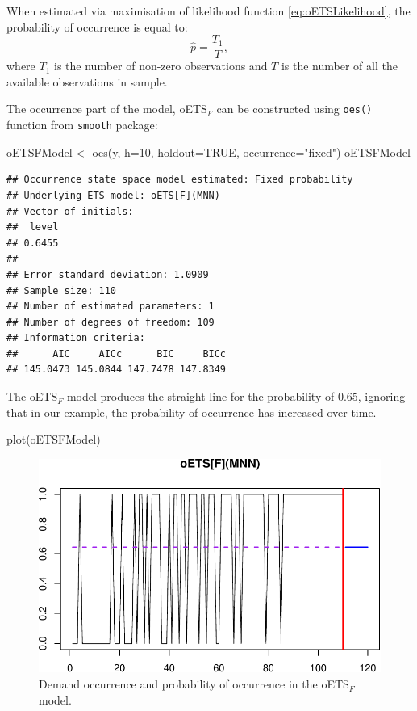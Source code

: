 \documentclass[
]{book}
\newenvironment{Shaded}{\begin{snugshade}}{\end{snugshade}}
\newcommand{\AttributeTok}[1]{\textcolor[rgb]{0.77,0.63,0.00}{#1}}
\newcommand{\ConstantTok}[1]{\textcolor[rgb]{0.00,0.00,0.00}{#1}}
\newcommand{\DecValTok}[1]{\textcolor[rgb]{0.00,0.00,0.81}{#1}}
\newcommand{\FunctionTok}[1]{\textcolor[rgb]{0.00,0.00,0.00}{#1}}
\newcommand{\NormalTok}[1]{#1}
\newcommand{\OtherTok}[1]{\textcolor[rgb]{0.56,0.35,0.01}{#1}}
\newcommand{\StringTok}[1]{\textcolor[rgb]{0.31,0.60,0.02}{#1}}
\theoremstyle{definition}
\theoremstyle{definition}
\theoremstyle{definition}
\theoremstyle{definition}
\theoremstyle{remark}
\begin{document}
When estimated via maximisation of likelihood function \eqref{eq:oETSLikelihood}, the probability of occurrence is equal to:
\begin{equation}
\hat{p} = \frac{T_1}{T},
\label{eq:oETSFixedProbabilityMLE}
\end{equation}
where \(T_1\) is the number of non-zero observations and \(T\) is the number of all the available observations in sample.

The occurrence part of the model, oETS\(_F\) can be constructed using \texttt{oes()} function from \texttt{smooth} package:

\begin{Shaded}
\begin{Highlighting}[]
\NormalTok{oETSFModel }\OtherTok{\textless{}{-}} \FunctionTok{oes}\NormalTok{(y, }\AttributeTok{h=}\DecValTok{10}\NormalTok{, }\AttributeTok{holdout=}\ConstantTok{TRUE}\NormalTok{,}
                  \AttributeTok{occurrence=}\StringTok{"fixed"}\NormalTok{)}
\NormalTok{oETSFModel}
\end{Highlighting}
\end{Shaded}

\begin{verbatim}
## Occurrence state space model estimated: Fixed probability
## Underlying ETS model: oETS[F](MNN)
## Vector of initials:
##  level 
## 0.6455 
## 
## Error standard deviation: 1.0909
## Sample size: 110
## Number of estimated parameters: 1
## Number of degrees of freedom: 109
## Information criteria: 
##      AIC     AICc      BIC     BICc 
## 145.0473 145.0844 147.7478 147.8349
\end{verbatim}

The oETS\(_F\) model produces the straight line for the probability of 0.65, ignoring that in our example, the probability of occurrence has increased over time.

\begin{Shaded}
\begin{Highlighting}[]
\FunctionTok{plot}\NormalTok{(oETSFModel)}
\end{Highlighting}
\end{Shaded}

\begin{figure}
\centering
\includegraphics{Svetunkov--2022----ADAM_files/figure-latex/oETSFModel-1.pdf}
\caption{\label{fig:oETSFModel}Demand occurrence and probability of occurrence in the oETS\(_F\) model.}
\end{figure}
\end{document}
